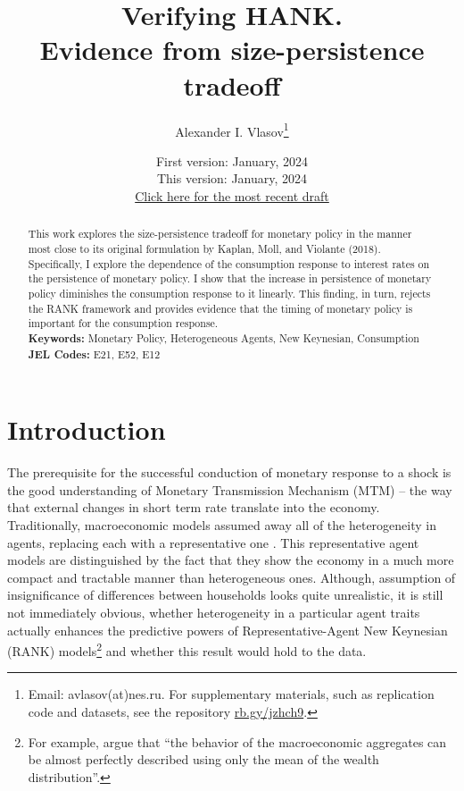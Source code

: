 \documentclass[12pt]{article}
\title{Verifying HANK.\\ Evidence from size-persistence tradeoff}
\author{Alexander I. Vlasov\thanks{Email: avlasov(at)nes.ru. For supplementary materials, such as replication code and datasets, see the repository \href{https://rb.gy/jzhch9}{rb.gy/jzhch9}.}}
\date{\normalsize First version: January, 2024\\\vspace{1ex} This version: January, 2024\\ \vspace{1ex}
\href{https://github.com/alvlsv/CheckingHank/blob/6906f23fcb1a16aa4fc9997532f52c1659e9c29f/Checking_HANK/Paper/CheckingHANK.pdf}{Click here for the most recent draft}}
\numberwithin{equation}{section}
\begin{document}
{}
\maketitle



\begin{abstract}
    \noindent This work explores the size-persistence tradeoff for monetary policy in the manner most close to its original formulation by Kaplan, Moll, and Violante (2018). Specifically, I explore the dependence of the consumption response to interest rates on the persistence of monetary policy. I show that the increase in persistence of monetary policy diminishes the consumption response to it linearly. This finding, in turn, rejects the RANK framework and provides evidence that the timing of monetary policy is important for the consumption response.
    \\
    \noindent\textbf{Keywords:} Monetary Policy, Heterogeneous Agents, New Keynesian, Consumption
    \\
    \noindent\textbf{JEL Codes:} E21, E52, E12 \\
    \bigskip
\end{abstract}

\section{Introduction}

The prerequisite for the successful conduction of monetary response to a shock is the good understanding of Monetary Transmission Mechanism (MTM) -- the way that external changes in short term rate translate into the economy. 
Traditionally, macroeconomic models assumed away all of the heterogeneity in agents, replacing each with a representative one \cite{Gali2018}.
This representative agent models are distinguished by the fact that they show the economy in a much more compact and tractable manner than heterogeneous ones.
Although, assumption of insignificance of differences between households looks quite unrealistic, it is still not immediately obvious, whether heterogeneity in a particular agent traits actually enhances the predictive powers of Representative-Agent New Keynesian (RANK) models\footnote{For example, \citet{Krusell1998} argue that  ``the behavior of the macroeconomic aggregates can be almost perfectly described using only the mean of the wealth distribution''.} 
and whether this result would hold to the data.
\end{document}
